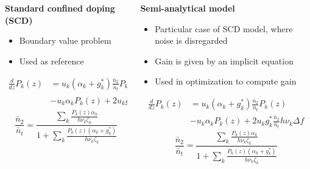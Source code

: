 \documentclass[10pt]{beamer}
\begin{document}
\begin{frame}
	\begin{columns}
		\begin{column}{0.33\textwidth}
			\textbf{Standard confined doping (SCD)}
			\begin{itemize}
				\item Boundary value problem 
				\item Used as reference
			\end{itemize}
			\begin{align*} \label{eq:scd} \nonumber
			\frac{d}{dz}P_k(z) &= u_k(\alpha_k + g^*_k)\frac{\bar{n}_2}{\bar{n}_t}P_k(z) \\
			&- u_k\alpha_kP_k(z) + 2u_kg^*_k\frac{\bar{n}_2}{\bar{n}_t}h\nu_k\Delta f
			\end{align*}
			\begin{equation*}
			\frac{\bar{n}_2}{\bar{n}_t} = \displaystyle\frac{\displaystyle\sum_k \displaystyle\frac{P_k(z)\alpha_k}{h\nu_k\zeta_k}}{1 + \displaystyle\sum_k \displaystyle\frac{P_k(z)(\alpha_k + g^*_k)}{h\nu_k\zeta_k}}
			\end{equation*}
		\end{column}
			\begin{column}{0.33\textwidth}
			\textbf{Semi-analytical model}
			\begin{itemize}
				\item Particular case of SCD model, where noise is disregarded
				\item Gain is given by an implicit equation
				\item Used in optimization to compute gain
			\end{itemize}
			\begin{align*} \label{eq:scd} \nonumber
			\frac{d}{dz}P_k(z) &= u_k(\alpha_k + g^*_k)\frac{\bar{n}_2}{\bar{n}_t}P_k(z) \\
			&- u_k\alpha_kP_k(z) + 2u_kg^*_k\frac{\bar{n}_2}{\bar{n}_t}h\nu_k\Delta f
			\end{align*}
			\begin{equation*}
			\frac{\bar{n}_2}{\bar{n}_t} = \displaystyle\frac{\displaystyle\sum_k \displaystyle\frac{P_k(z)\alpha_k}{h\nu_k\zeta_k}}{1 + \displaystyle\sum_k \displaystyle\frac{P_k(z)(\alpha_k + g^*_k)}{h\nu_k\zeta_k}}
			\end{equation*}
		\end{column}
	\end{columns}
\end{frame}
\end{document}
